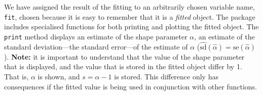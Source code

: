 \documentclass{article}\usepackage[]{graphicx}\usepackage[]{xcolor}
\newcommand{\rcode}[1]{\lstinline[language=R,basicstyle=\normalsize\ttfamily]!#1!}
\begin{document}
We have assigned the result of the fitting to an arbitrarily chosen variable name, \rcode{fit}, chosen because it is easy to remember that it is a \emph{fitted} object. The package includes specialised functions for both printing and plotting the fitted object. The \rcode{print} method displays an estimate of the shape parameter $\alpha$, an estimate of the standard deviation---the standard error---of the estimate of $\alpha$ ($\widehat{\mathrm{sd}}(\hat{\alpha})=\mathrm{se}(\hat{\alpha})$). \textbf{Note:} it is important to understand that the value of the shape parameter that is displayed, and the value that is stored in the fitted object differ by 1. That is, $\alpha$ is shown, and $s = \alpha - 1$ is stored. This difference only has consequences if the fitted value is being used in conjunction with other functions.
\end{document}
